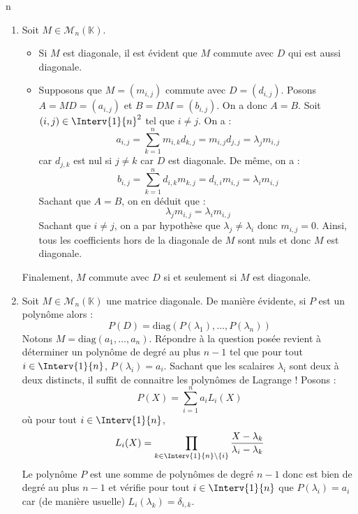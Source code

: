 n\documentclass[a4paper,10pt]{report}
\begin{document}
\corr \begin{enumerate}
\item Soit $M \in \mathcal{M}_n(\mathbb{K})$. 
\begin{itemize}
\item Si $M$ est diagonale, il est évident que $M$ commute avec $D$ qui est aussi diagonale.
\item Supposons que $M=(m_{i,j})$ commute avec $D=(d_{i,j})$. Posons $A=MD=(a_{i,j})$ et $B=DM=(b_{i,j})$. On a donc $A=B$. Soit $(i,j) \in \Interv{1}{n}^2$ tel que $i \neq j$. On a :
$$ a_{i,j} = \sum_{k=1}^n m_{i,k} d_{k,j} = m_{i,j} d_{j,j} = \lambda_j m_{i,j}$$
car $d_{j,k}$ est nul si $j \neq k$ car $D$ est diagonale.
De même, on a :
$$ b_{i,j} = \sum_{k=1}^n d_{i,k} m_{k,j} = d_{i,i}m_{i,j} = \lambda_i m_{i,j}$$
Sachant que $A=B$, on en déduit que :
$$ \lambda_j m_{i,j} = \lambda_i m_{i,j}$$
Sachant que $i \neq j$, on a par hypothèse que $\lambda_j \neq \lambda_i$ donc $m_{i,j}=0$. Ainsi, tous les coefficients hors de la diagonale de $M$ sont nuls et donc $M$ est diagonale.
\end{itemize}
Finalement, $M$ commute avec $D$ si et seulement si $M$ est diagonale.
\item Soit $M \in \mathcal{M}_n(\mathbb{K})$ une matrice diagonale. De manière évidente, si $P$ est un polynôme alors :
$$ P(D) = \textrm{diag}(P(\lambda_1), \ldots, P(\lambda_n))$$
Notons $M= \textrm{diag}(a_1, \ldots, a_n)$. Répondre à la question posée revient à déterminer un polynôme de degré au plus $n-1$ tel que pour tout $i \in \Interv{1}{n}$, $P(\lambda_i)= a_i$. Sachant que les scalaires $\lambda_i$ sont deux à deux distincts, il suffit de connaitre les polynômes de Lagrange ! Posons :
$$ P(X) = \sum_{i=1}^n a_i L_i(X)$$
où pour tout $i \in \Interv{1}{n}$,
$$ L_i(X) = \prod_{k \in \Interv{1}{n} \setminus \lbrace i \rbrace} \dfrac{X-\lambda_k}{\lambda_i- \lambda_k}$$
Le polynôme $P$ est une somme de polynômes de degré $n-1$ donc est bien de degré au plus $n-1$ et vérifie pour tout $i \in \Interv{1}{n}$ que $P(\lambda_i)= a_i$ car (de manière usuelle) $L_i(\lambda_k) = \delta_{i,k}$.

\end{enumerate}
\end{document}
